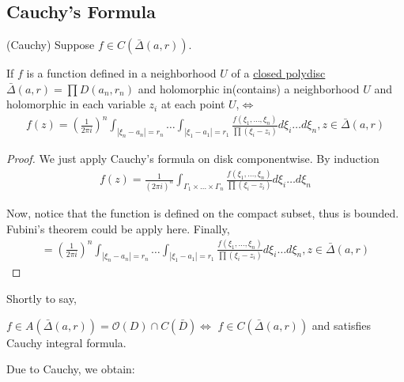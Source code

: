 \documentclass[Total.tex]{subfiles}
\begin{document}
		\subsection{Cauchy's Formula}
			\begin{proposition}
				(Cauchy) Suppose $f\in C(\bar{\Delta}(a,r))$. 
				
				If $f$ is a function defined in a neighborhood $U$ of a \underline{closed polydisc} $\bar{\Delta}(a,r)=\prod D(a_n,r_n)$ and holomorphic in(contains) a neighborhood $U$ and holomorphic in each variable $z_i$ at each point $U$,$\Leftrightarrow$
				\begin{gather*}
					f(z)=(\frac{1}{2\pi i})^n \int_{|\xi_n-a_n|=r_n}\dots \int_{|\xi_1-a_1|=r_1} \frac{f(\xi_1,\dots,\xi_n)}{\prod (\xi_i-z_i)} d\xi_i\dots d\xi_n,z\in \bar{\Delta}(a,r)
				\end{gather*}
			\end{proposition}
			\begin{proof}
				We just apply Cauchy's formula on disk componentwise. By induction
				\begin{gather*}
					f(z)=\frac{1}{(2\pi i)^n} \int_{\Gamma_1\times\dots\times \Gamma_n} \frac{f(\xi_1,\dots,\xi_n)}{\prod (\xi_i-z_i)} d\xi_i\dots d\xi_n
				\end{gather*}
				
				Now, notice that the function is defined on the compact subset, thus is bounded. Fubini's theorem could be apply here. Finally,
				\begin{gather*}
					=(\frac{1}{2\pi i})^n \int_{|\xi_n-a_n|=r_n}\dots \int_{|\xi_1-a_1|=r_1} \frac{f(\xi_1,\dots,\xi_n)}{\prod (\xi_i-z_i)} d\xi_i\dots d\xi_n,z\in \bar{\Delta}(a,r)
				\end{gather*}
			\end{proof}
			
			Shortly to say,
			\begin{center}
				$f\in A(\bar{\Delta}(a,r))=\mathcal{O}(D)\cap C(\bar{D})$$\Leftrightarrow$ $f\in C(\bar\Delta(a,r))$ and satisfies Cauchy integral formula.
			\end{center}
			Due to Cauchy, we obtain:
			
\end{document}
